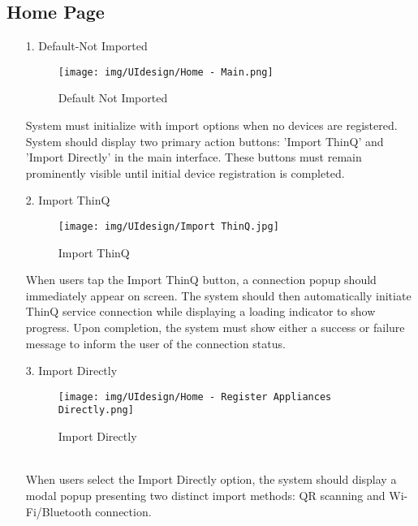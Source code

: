 \documentclass[conference]{IEEEtran}
\begin{document}
    
    

\subsection{Home Page}

\begin{enumerate}
    \item[1.] Default-Not Imported
    \begin{figure}[h]
\hspace{1.5cm}
\centering
\begin{minipage}{0.4\columnwidth}
    \texttt{[image: img/UIdesign/Home - Main.png]}
    \caption{Default Not Imported}
\end{minipage}
\end{figure}
    
    System must initialize with import options when no devices are registered. System should display two primary action buttons: 'Import ThinQ' and 'Import Directly' in the main interface. These buttons must remain prominently visible until initial device registration is completed. \\
\end{enumerate}

\begin{enumerate}
    \item[2.] Import ThinQ
    \begin{figure}[h]
\hspace{1.5cm}
\centering
\begin{minipage}{0.4\columnwidth}
    \texttt{[image: img/UIdesign/Import ThinQ.jpg]}
    \caption{Import ThinQ}
\end{minipage}
\end{figure}
    
    When users tap the Import ThinQ button, a connection popup should immediately appear on screen. The system should then automatically initiate ThinQ service connection while displaying a loading indicator to show progress. Upon completion, the system must show either a success or failure message to inform the user of the connection status.  \\
\end{enumerate}

\begin{enumerate}
    \item[3.] Import Directly
    \begin{figure}[h]
\hspace{1.5cm}
\centering
\begin{minipage}{0.4\columnwidth}
    \texttt{[image: img/UIdesign/Home - Register Appliances Directly.png]}
    \caption{Import Directly}
\end{minipage}
\end{figure} \\
    
    When users select the Import Directly option, the system should display a modal popup presenting two distinct import methods: QR scanning and Wi-Fi/Bluetooth connection. \\ 
\end{enumerate}
\end{document}
